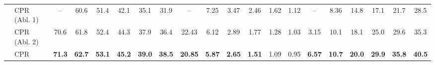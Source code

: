 \begin{table}[th!]
{\begin{tabular}{cl|cccccc|cccccc|cccccc}
 & CPR (Abl. 1)
& -- & 60.6 & 51.4 & 42.1 & 35.1 & 31.9
& -- & 7.25 & 3.47 & 2.46 & 1.62 & 1.12
& -- & 8.36 & 14.8 & 17.1 & 21.7 & 28.5 \\
 & CPR (Abl. 2)
& 70.6 & 61.8 & 52.4 & 44.3 & 37.9 & 36.4
& 22.43 & 6.12 & 2.89 & 1.77 & 1.28 & 1.03
& 3.15 & 10.1 & 18.1 & 25.0 & 29.6 & 35.3 \\
 & CPR
& \textbf{71.3} & \textbf{62.7} & \textbf{53.1} & \textbf{45.2} & \textbf{39.0} & \textbf{38.5}
& \textbf{20.85} & \textbf{5.87} & \textbf{2.65} & \textbf{1.51} & 1.09 & 0.95
& \textbf{6.57} & \textbf{10.7} & \textbf{20.0} & \textbf{29.9} & \textbf{35.8} & \textbf{40.5} \\
\bottomrule
\end{tabular}
}
\label{tab:full_results}
\end{table}
